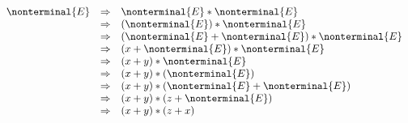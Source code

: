  \[
  \begin{array}{rcl}
    \nonterminal{E} &\Rightarrow& \nonterminal{E}*\nonterminal{E} \\
      &\Rightarrow& (\nonterminal{E})*\nonterminal{E}\\
      &\Rightarrow& (\nonterminal{E}+\nonterminal{E})*\nonterminal{E}\\
      &\Rightarrow& (x+\nonterminal{E})*\nonterminal{E}\\
      &\Rightarrow& (x+y)*\nonterminal{E}\\
      &\Rightarrow& (x+y)*(\nonterminal{E})\\
      &\Rightarrow& (x+y)*(\nonterminal{E}+\nonterminal{E})\\
      &\Rightarrow& (x+y)*(z+\nonterminal{E})\\
      &\Rightarrow& (x+y)*(z+x)\\
  \end{array}
  \]